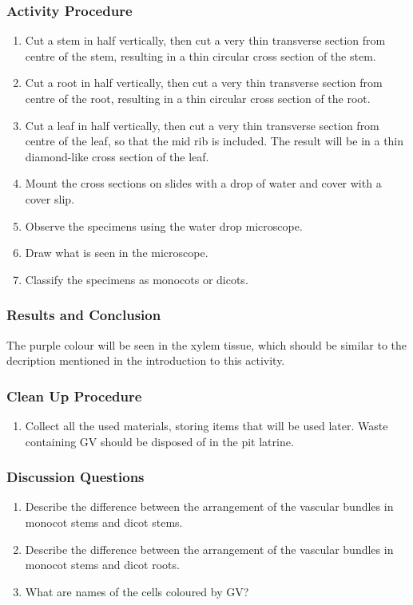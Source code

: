\subsubsection*{Activity Procedure}
\begin{enumerate}
\item{Cut a stem in half vertically, then cut a very thin transverse section from centre of the stem, resulting in a thin circular cross section of the stem.}
\item{Cut a root in half vertically, then cut a very thin transverse section from centre of the root, resulting in a thin circular cross section of the root.}
\item{Cut a leaf in half vertically, then cut a very thin transverse section from centre of the leaf, so that the mid rib is included. The result will be in a thin diamond-like cross section of the leaf.}
\item{Mount the cross sections on slides with a drop of water and cover with a cover slip.}
\item{Observe the specimens using the water drop microscope.}
\item{Draw what is seen in the microscope.}
\item{Classify the specimens as monocots or dicots.}
\end{enumerate}

\subsubsection*{Results and Conclusion}
The purple colour will be seen in the xylem tissue, which should be similar to the decription mentioned in the introduction to this activity.

\subsubsection*{Clean Up Procedure}
\begin{enumerate}
\item{Collect all the used materials, storing items that will be used later. Waste containing GV should be disposed of in the pit latrine.}
\end{enumerate}

\subsubsection*{Discussion Questions}
\begin{enumerate}
\item{Describe the difference between the arrangement of the vascular bundles in monocot stems and dicot stems.}
\item{Describe the difference between the arrangement of the vascular bundles in monocot stems and dicot roots.}
\item{What are names of the cells coloured by GV?}
\end{enumerate}

